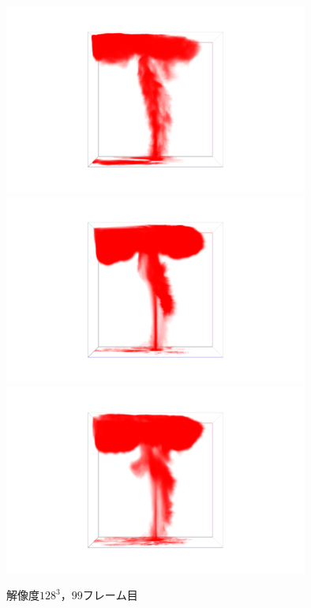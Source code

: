 \documentclass[a4j,12pt]{jreport}
\begin{document}
\begin{figure}[htbp]
\caption{$解像度128^3，99フレーム目$}
\label{fig:n128_f99}
\centering
\includegraphics[width=100mm]{images/n128_f99_truth.png}
\includegraphics[width=100mm]{images/n128_f99_dev1.png}
\includegraphics[width=100mm]{images/n128_f99_dev2.png}
\end{figure}
\end{document}
